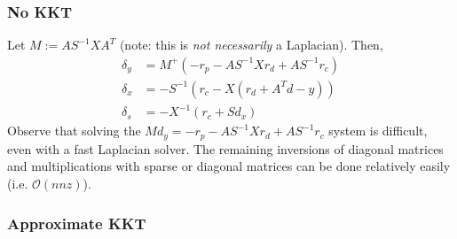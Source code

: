 \documentclass[10pt,a4paper]{article}
\newcommand{\Oo}{\mathcal{O}}
\begin{document}
\subsubsection{No KKT}

Let $M := AS^{-1}XA^T$ (note: this is \emph{not necessarily} a Laplacian). Then,
\begin{align*}
\delta_y &= M^+(-r_p - AS^{-1}Xr_d + AS^{-1}r_c) \\
\delta_x &= -S^{-1}(r_c - X(r_d + A^Td-y))\\
\delta_s &= -X^{-1}(r_c + Sd_x)
\end{align*}
Observe that solving the $Md_y = -r_p - AS^{-1}Xr_d + AS^{-1}r_c$ system is difficult, even with a fast Laplacian solver. The remaining inversions of diagonal matrices and multiplications with sparse or diagonal matrices can be done relatively easily (i.e. $\Oo(nnz)$).

\subsubsection{Approximate KKT}
\end{document}
